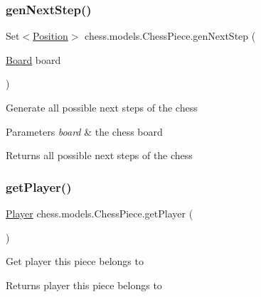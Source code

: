 \subsubsection{\texorpdfstring{gen\+Next\+Step()}{genNextStep()}}
{\footnotesize\ttfamily Set$<$\mbox{\hyperlink{classchess_1_1models_1_1_position}{Position}}$>$ chess.\+models.\+Chess\+Piece.\+gen\+Next\+Step (\begin{DoxyParamCaption}\item[{\mbox{\hyperlink{classchess_1_1models_1_1_board}{Board}}}]{board }\end{DoxyParamCaption})}

Generate all possible next steps of the chess


\begin{DoxyParams}{Parameters}
{\em board} & the chess board \\
\hline
\end{DoxyParams}
\begin{DoxyReturn}{Returns}
all possible next steps of the chess 
\end{DoxyReturn}
\mbox{\label{classchess_1_1models_1_1_chess_piece_aaa3cef5d52e4a228dc01f91133a6c437}} 
\subsubsection{\texorpdfstring{get\+Player()}{getPlayer()}}
{\footnotesize\ttfamily \mbox{\hyperlink{enumchess_1_1models_1_1enums_1_1_player}{Player}} chess.\+models.\+Chess\+Piece.\+get\+Player (\begin{DoxyParamCaption}{ }\end{DoxyParamCaption})}

Get player this piece belongs to

\begin{DoxyReturn}{Returns}
player this piece belongs to 
\end{DoxyReturn}
\mbox{\label{classchess_1_1models_1_1_chess_piece_a4ce783eeb2ec6d5cd83af05c11fe8cdb}} 
